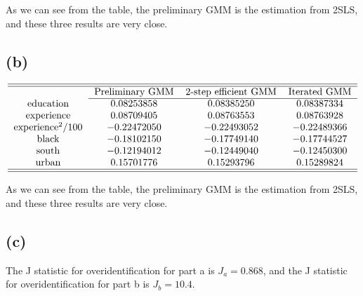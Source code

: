 \documentclass{article}
\begin{document}
As we can see from the table, the preliminary GMM is the estimation from
2SLS, and these three results are very close.

\subsection*{(b)}

\begin{equation*}
\begin{tabular}{cccc}
\hline\hline
& Preliminary GMM & 2-step efficient GMM & Iterated GMM \\ \cline{2-4}
education & $0.08253858$ & $0.08385250$ & $0.08387334$ \\ 
experience & $0.08709405$ & $0.08763553$ & $0.08763928$ \\ 
experience$^{2}/100$ & $-0.22472050$ & $-0.22493052$ & $-0.22489366$ \\ 
black & $-0.18102150$ & $-0.17749140$ & $-0.17744527$ \\ 
south & $-0.12194012$ & $-0.12449040$ & $-0.12450300$ \\ 
urban & $0.15701776$ & $0.15293796$ & $0.15289824$ \\ \hline\hline
\end{tabular}%
\end{equation*}

As we can see from the table, the preliminary GMM is the estimation from
2SLS, and these three results are very close.

\subsection*{(c)}

The J statistic for overidentification for part a is $J_{a}=0.868$, and the
J statistic for overidentification for part b is $J_{b}=10.4$.
\end{document}
